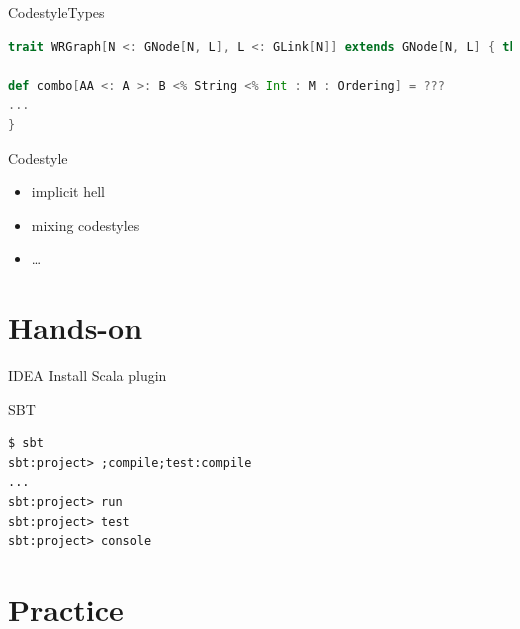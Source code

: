 \documentclass[aspectratio=169]{beamer}
\begin{document}
\begin{frame}[fragile]{Codestyle}{Types}
\begin{lstlisting}[style=scala,language=scala]
trait WRGraph[N <: GNode[N, L], L <: GLink[N]] extends GNode[N, L] { this: N =>

def combo[AA <: A >: B <% String <% Int : M : Ordering] = ???
...
}
\end{lstlisting}
\end{frame}

\begin{frame}{Codestyle}
  \begin{itemize}
    \item implicit hell
    \item mixing codestyles
    \item \ldots
  \end{itemize}
\end{frame}

\section{Hands-on}

\begin{frame}{IDEA}
\centering\Large Install Scala plugin
\end{frame}

\begin{frame}[fragile]{SBT}
\begin{verbatim}
$ sbt
sbt:project> ;compile;test:compile
...
sbt:project> run
sbt:project> test
sbt:project> console
\end{verbatim}
\end{frame}

\section{Practice}
\end{document}
